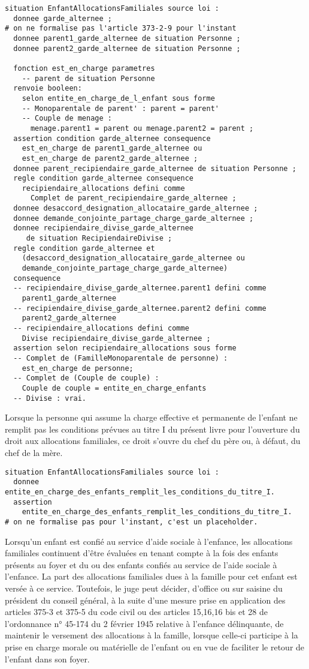 \documentclass[11pt, french]{article}
\begin{document}
\begin{lstlisting}
situation EnfantAllocationsFamiliales source loi :
  donnee garde_alternee ;
# on ne formalise pas l'article 373-2-9 pour l'instant
  donnee parent1_garde_alternee de situation Personne ;
  donnee parent2_garde_alternee de situation Personne ;

  fonction est_en_charge parametres
    -- parent de situation Personne
  renvoie booleen:
    selon entite_en_charge_de_l_enfant sous forme
    -- Monoparentale de parent' : parent = parent'
    -- Couple de menage :
      menage.parent1 = parent ou menage.parent2 = parent ;
  assertion condition garde_alternee consequence
    est_en_charge de parent1_garde_alternee ou
    est_en_charge de parent2_garde_alternee ;
  donnee parent_recipiendaire_garde_alternee de situation Personne ;
  regle condition garde_alternee consequence
    recipiendaire_allocations defini comme
      Complet de parent_recipiendaire_garde_alternee ;
  donnee desaccord_designation_allocataire_garde_alternee ;
  donnee demande_conjointe_partage_charge_garde_alternee ;
  donnee recipiendaire_divise_garde_alternee
     de situation RecipiendaireDivise ;
  regle condition garde_alternee et
    (desaccord_designation_allocataire_garde_alternee ou
    demande_conjointe_partage_charge_garde_alternee)
  consequence
  -- recipiendaire_divise_garde_alternee.parent1 defini comme
    parent1_garde_alternee
  -- recipiendaire_divise_garde_alternee.parent2 defini comme
    parent2_garde_alternee
  -- recipiendaire_allocations defini comme
    Divise recipiendaire_divise_garde_alternee ;
  assertion selon recipiendaire_allocations sous forme
  -- Complet de (FamilleMonoparentale de personne) :
    est_en_charge de personne;
  -- Complet de (Couple de couple) :
    Couple de couple = entite_en_charge_enfants
  -- Divise : vrai.
\end{lstlisting}
Lorsque la personne qui assume la charge effective et permanente de l'enfant ne remplit pas les conditions prévues au titre I du présent livre pour l'ouverture du droit aux allocations familiales, ce droit s'ouvre du chef du père ou, à défaut, du chef de la mère.
\begin{lstlisting}
situation EnfantAllocationsFamiliales source loi :
  donnee entite_en_charge_des_enfants_remplit_les_conditions_du_titre_I.
  assertion
    entite_en_charge_des_enfants_remplit_les_conditions_du_titre_I.
# on ne formalise pas pour l'instant, c'est un placeholder.
\end{lstlisting}
Lorsqu'un enfant est confié au service d'aide sociale à l'enfance, les allocations familiales continuent d'être évaluées en tenant compte à la fois des enfants présents au foyer et du ou des enfants confiés au service de l'aide sociale à l'enfance. La part des allocations familiales dues à la famille pour cet enfant est versée à ce service. Toutefois, le juge peut décider, d'office ou sur saisine du président du conseil général, à la suite d'une mesure prise en application des articles 375-3 et 375-5 du code civil ou des articles 15,16,16 bis et 28 de l'ordonnance n° 45-174 du 2 février 1945 relative à l'enfance délinquante, de maintenir le versement des allocations à la famille, lorsque celle-ci participe à la prise en charge morale ou matérielle de l'enfant ou en vue de faciliter le retour de l'enfant dans son foyer.
\end{document}
